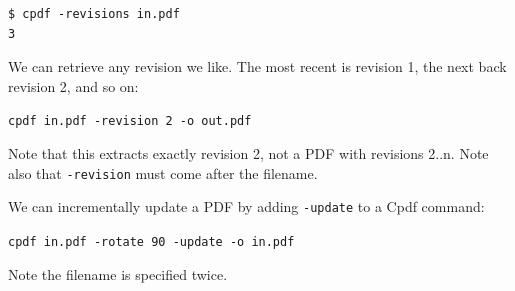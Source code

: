 \documentclass{book}
\begin{document}
{\small\begin{verbatim}
$ cpdf -revisions in.pdf
3
\end{verbatim}}

\noindent We can retrieve any revision we like. The most recent is revision 1, the next back revision 2, and so on:

\begin{framed}
 \noindent\small\verb?cpdf in.pdf -revision 2 -o out.pdf?
\end{framed}

\noindent Note that this extracts exactly revision 2, not a PDF with revisions 2..n. Note also that \texttt{-revision} must come after the filename.

We can incrementally update a PDF by adding \texttt{-update} to a Cpdf command:

\begin{framed}
 \noindent\small\verb?cpdf in.pdf -rotate 90 -update -o in.pdf?
\end{framed}

\noindent Note the filename is specified twice.

\pagestyle{empty}
\thispagestyle{fancy}
\end{document}
